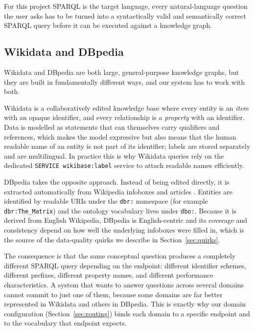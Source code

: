 \documentclass[11pt,a4paper]{article}
\begin{document}
For this project SPARQL is the target language, every natural-language
question the user asks has to be turned into a syntactically valid and
semantically correct SPARQL query before it can be executed against a
knowledge graph.

\subsection{Wikidata and DBpedia}
\label{sec:kgs}
Wikidata and DBpedia are both large, general-purpose knowledge graphs,
but they are built in fundamentally different ways, and our system has
to work with both.

Wikidata is a collaboratively edited knowledge base where every entity
is an \emph{item} with an opaque identifier, and
every relationship is a \emph{property} with an identifier. 
Data is modelled as statements that can themselves carry qualifiers and
references, which makes the model expressive but also means that the
human readable name of an entity is not part of its identifier; labels are stored separately and are multilingual. In practice this is
why Wikidata queries rely on the dedicated
\texttt{SERVICE wikibase:label} service to attach readable names
efficiently.

DBpedia takes the opposite approach. Instead of being edited directly,
it is extracted automatically from Wikipedia infoboxes and articles
\cite{auer2007dbpedia,lehmann2015dbpedia}. Entities are identified by
readable URIs under the \texttt{dbr:} namespace (for example
\texttt{dbr:The\_Matrix}) and the ontology vocabulary lives under
\texttt{dbo:}. Because it is derived from English Wikipedia, DBpedia
is English-centric and its coverage and consistency depend on how well
the underlying infoboxes were filled in, which is the source of the
data-quality quirks we describe in Section~\ref{sec:quirks}.

The consequence is that the same conceptual question produces a
completely different SPARQL query depending on the endpoint: different
identifier schemes, different prefixes, different property names, and
different performance characteristics. A system that wants to answer
questions across several domains cannot commit to just one of them,
because some domains are far better represented in Wikidata and others
in DBpedia. This is exactly why our domain configuration
(Section~\ref{sec:routing}) binds each domain to a specific endpoint
and to the vocabulary that endpoint expects.
\end{document}
